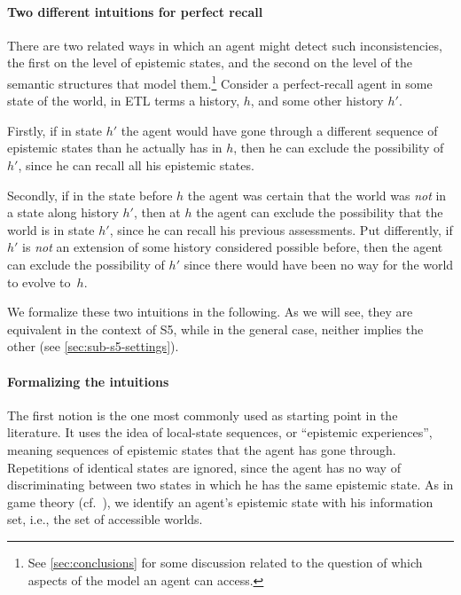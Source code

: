 \documentclass{article}
\newcounter{#1}
\begin{document}
\paragraph{Two different intuitions for perfect recall}
\label{sec:intuitions}

There are two related ways in which an agent might detect such inconsistencies,
the first on the level of epistemic states,
and the second on the level of the semantic structures that model them.\footnote{See \cref{sec:conclusions} for some discussion
related to the question of which aspects of the model an agent can access.}
Consider a perfect-recall agent in some state of the world, in ETL terms a history, $h$,
and some other history $h'$.

Firstly, if in state $h'$ the agent would have gone through a different sequence of epistemic states
than he actually has in $h$,
then he can exclude the possibility of $h'$, since he can recall all his epistemic states.

Secondly, if in the state before $h$ the agent was certain
that the world was \emph{not} in a state along history $h'$,
then at $h$ the agent can exclude the possibility that the world is in state $h'$,
since he can recall his previous assessments.
Put differently, if $h'$ is \emph{not} an extension of some history considered possible before,
then the agent can exclude the possibility of $h'$ since there would have been no way for the world to evolve to~$h$.

We formalize these two intuitions in the following.
As we will see, they are equivalent in the context of S5,
while in the general case, neither implies the other (see \cref{sec:sub-s5-settings}).

\paragraph{Formalizing the intuitions}
\label{sec:form-intu}

The first notion is the one most commonly used as starting point in the literature.
It uses the idea of local-state sequences, or ``epistemic experiences'',
meaning sequences of epistemic states that the agent has gone through.
Repetitions of identical states are ignored,
since the agent has no way of discriminating between two states in which he has the same epistemic state.
As in game theory (cf.~\cite[Section~11.1.3]{osborne_course_1994}),
we identify an agent's epistemic state with his information set,
i.e., the set of accessible worlds.
\end{document}
